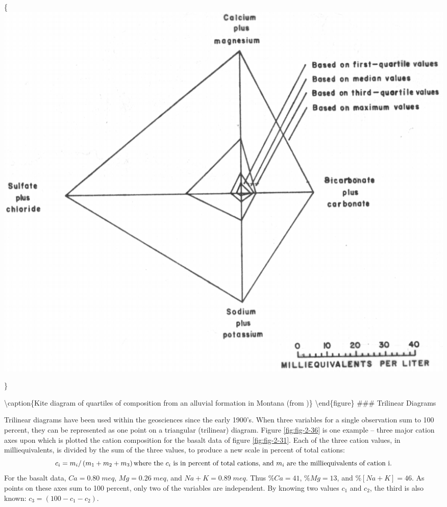 \documentclass[]{book}
\begin{document}
\{\centering \includegraphics[width=12.18in]{figures/2_35}

\}

\textbackslash{}caption\{Kite diagram of quartiles of composition from an alluvial formation in Montana (from \citet{davis_assessment_1984})\}\label{fig:fig-2-35}
\textbackslash{}end\{figure\}
\#\#\# Trilinear Diagrams

Trilinear diagrams have been used within the geosciences since the early 1900's. When three variables for a single observation sum to 100 percent, they can be represented as one point on a triangular (trilinear) diagram. Figure \ref{fig:fig-2-36} is one example -- three major cation axes upon which is plotted the cation composition for the basalt data of figure \ref{fig:fig-2-31}. Each of the three cation values, in milliequivalents, is divided by the sum of the three values, to produce a new scale in percent of total cations:
\begin{equation}
c_{i} = m_{i} / \left( m_{1} + m_{2} + m_{3} \right) \\
\text{where the $c_{i}$ is in percent of total cations, and $m_{i}$ are the milliequivalents of cation i.}
\label{eq:2-4}
\end{equation}
For the basalt data, \(Ca = 0.80\;meq\), \(Mg = 0.26\;meq\), and \(Na + K = 0.89\;meq\). Thus \(\% Ca = 41\), \(\% Mg = 13\), and \(\%[Na + K] = 46\). As points on these axes sum to 100 percent, only two of the variables are independent. By knowing two values \(c_{1}\) and \(c_{2}\), the third is also known: \(c_{3} = \left( 100 − c_{1} − c_{2} \right)\).
\end{document}
